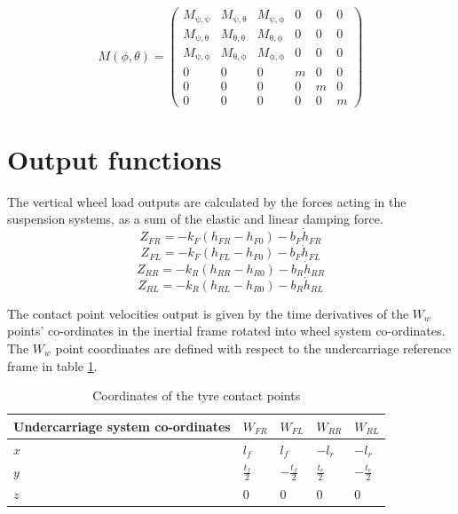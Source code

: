 $$
M(\phi,\theta)=\left(\begin{array}{cccccc} M_{\mathrm{\psi},\mathrm{\psi}} & M_{\mathrm{\psi},\mathrm{\theta}} & M_{\mathrm{\psi},\mathrm{\phi}} & 0 & 0 & 0\\ M_{\mathrm{\psi},\mathrm{\theta}} & M_{\mathrm{\theta},\mathrm{\theta}} & M_{\mathrm{\theta},\mathrm{\phi}} & 0 & 0 & 0\\ M_{\mathrm{\psi},\mathrm{\phi}} & M_{\mathrm{\theta},\mathrm{\phi}} & M_{\mathrm{\phi},\mathrm{\phi}} & 0 & 0 & 0\\ 0 & 0 & 0 & m & 0 & 0\\ 0 & 0 & 0 & 0 & m & 0\\ 0 & 0 & 0 & 0 & 0 & m \end{array}\right)
$$

\section{Output functions}
\label{sec:6dofout}
The vertical wheel load outputs are calculated by the forces acting in the suspension systems, as a sum of the elastic and linear damping force.
$$Z_{FR} = - k_F (h_{FR} - h_{F0}) - b_F \dot h_{FR} $$
$$Z_{FL} = - k_F (h_{FL} - h_{F0}) - b_F \dot h_{FL} $$
$$Z_{RR} = - k_R (h_{RR} - h_{R0}) - b_R \dot h_{RR} $$
$$Z_{RL} = - k_R (h_{RL} - h_{R0}) - b_R \dot h_{RL} $$

The contact point velocities output is given by the time derivatives of the $W_w$ points' co-ordinates in the inertial frame rotated into wheel system co-ordinates. The $W_w$ point coordinates are defined with respect to the undercarriage reference frame in table \ref{table:contactpoints}.

\begin{table}[ht]
  \caption{Coordinates of the tyre contact points} %
  \centering %
  \begin{tabular}{l l l l l} %
    \hline\hline %
    Undercarriage system co-ordinates & $W_{FR}$ & $W_{FL}$ & $W_{RR}$ & $W_{RL}$ \\ [0.5ex] %
    \hline %
    $ x$ & $ l_f$ & $ l_f$ & $-l_r $ & $-l_r $\\ %
    $ y$ & $ \frac{t_f}{2} $ & $ -\frac{t_f}{2}$ & $ \frac{t_r}{2}$ & $ -\frac{t_r}{2}$\\ %
    $ z$ & $ 0 $& $ 0 $ & $ 0$ & $ 0$ \\ [1ex] %
    \hline %
  \end{tabular}
  \label{table:contactpoints} %
\end{table}
